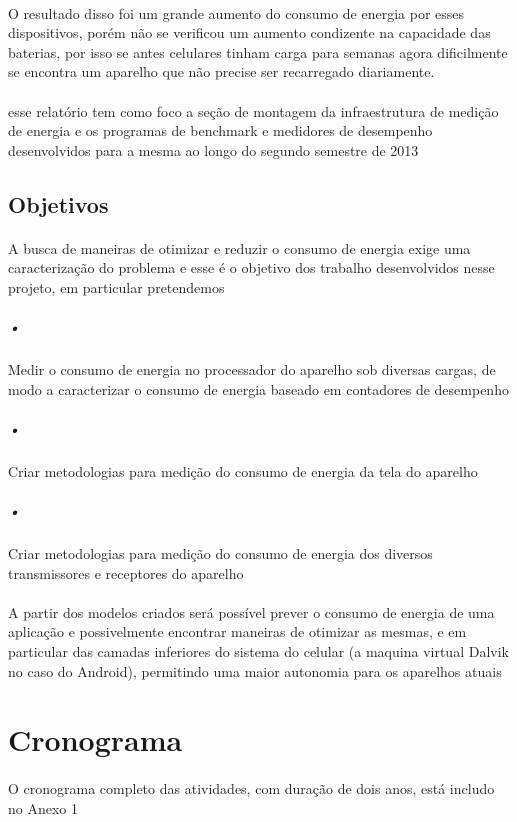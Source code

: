 \documentclass[11pt,a4paper,titlepage]{article}
\begin{document}
\paragraph{} O resultado disso foi um grande aumento do consumo de energia por esses dispositivos, porém não se verificou um aumento condizente na capacidade das baterias, por isso se antes celulares tinham carga para semanas agora dificilmente se encontra um aparelho que não precise ser recarregado diariamente.
\paragraph{} esse relatório tem como foco a seção de montagem da infraestrutura de medição de energia e os programas de benchmark e medidores de desempenho desenvolvidos para a mesma ao longo do segundo semestre de 2013
\subsection{Objetivos}
\paragraph{} A busca de maneiras de otimizar e reduzir o consumo de energia exige uma caracterização do problema e esse é o objetivo dos trabalho desenvolvidos nesse projeto, em particular pretendemos 
\subparagraph{•} Medir o consumo de energia no processador do aparelho sob diversas cargas, de modo a caracterizar o consumo de energia baseado em contadores de desempenho
\subparagraph{•} Criar metodologias para medição do consumo de energia da tela do aparelho
\subparagraph{•} Criar metodologias para medição do consumo de energia dos diversos transmissores e receptores do aparelho  
\paragraph{} A partir dos modelos criados será possível prever o consumo de energia de uma aplicação e possivelmente encontrar maneiras de otimizar as mesmas, e em particular das camadas inferiores do sistema do celular (a maquina virtual Dalvik no caso do Android), permitindo uma maior autonomia para os aparelhos atuais

\section{Cronograma}
\paragraph{} O cronograma completo das atividades, com duração de dois anos, está includo no Anexo 1
\end{document}
